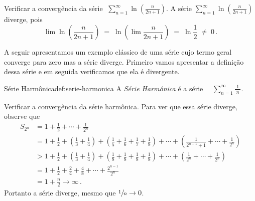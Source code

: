 \begin{example}
  Verificar a convergência da série
  \(\;
    \sum_{n=1}^\infty \ln\left(\frac{n}{2n+1}\right)
  \).
  \solution
  A série \(\sum_{n=1}^\infty \ln\left(\frac{n}{2n+1}\right)\) diverge, pois
  \[
    \lim\ln\left(\frac{n}{2n+1}\right) \;=\; \ln\left(\lim \frac{n}{2n+1}\right)
                                       \;=\; \ln{\frac{1}{2}}
                                       \;\neq\; 0     \,.
  \]
\end{example}

A seguir apresentamos um exemplo clássico de uma série cujo termo geral converge para
zero mas a série diverge. Primeiro vamos apresentar a definição dessa
série e em seguida verificamos que ela é divergente.

\begin{definicao}{Série Harmônica}{def:serie-harmonica}
  A \emph{Série Harmônica} é a série
  \(\quad
    \sum_{n=1}^\infty \frac{1}{\;n\;}
  \).
\end{definicao}

\begin{example}
  Verificar a convergência da série harmônica.
  \solution
  Para ver que essa série diverge, observe que
  \begin{align*}
   	\!\!\!S_{2^n} & = 1 + \frac{1}{2} + \cdots + \frac{1}{2^n} \\[3mm]
  	              & = 1 + \frac{1}{2}
                    + \left( \frac{1}{3} + \frac{1}{4} \right)
                    + \left( \frac{1}{5} + \frac{1}{6} + \frac{1}{7} + \frac{1}{8} \right)
                    + \cdots
                    + \left( \frac{1}{2^{n-1}+1} + \cdots + \frac{1}{2^n} \right) \\[3mm]
  	              & > 1 + \frac{1}{2}
                    + \left( \frac{1}{3} + \frac{1}{4} \right)
                    + \left( \frac{1}{8} + \frac{1}{8} + \frac{1}{8} + \frac{1}{8} \right)
                    + \cdots
                    + \left( \frac{1}{2^n} + \cdots + \frac{1}{2^n} \right) \\[3mm]
  	              & = 1 + \frac{1}{2}
                    + \frac{2}{4}
                    + \frac{4}{8} + \cdots
                    + \frac{2^{n-1}}{2^n}  \\[3mm]
  	              & = 1 + \frac{n}{2} \to \infty    \,.
  \end{align*}
  Portanto a série diverge, mesmo que $\sfrac{1}{n}\to0$.
\end{example}

